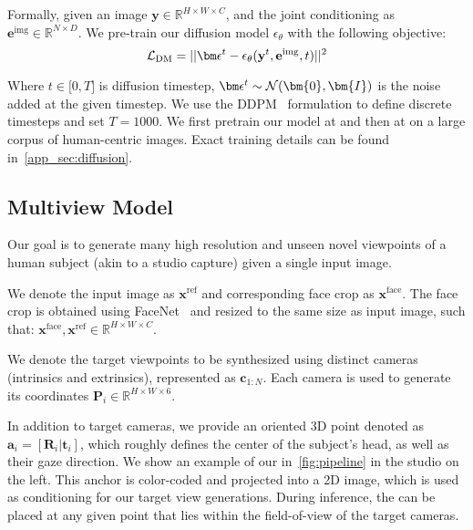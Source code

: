 Formally, given an image $\mathbf{y} \in \mathbb R^{H \times W \times C}$, and the joint conditioning as $\mathbf{e}^{\text{img}} \in \mathbb R^{N \times D}$. We pre-train our diffusion model $\epsilon_\theta$ with the following objective: 
\begin{equation}\label{eq:dm_loss}
    \mathcal{L}_{\mathrm{DM}} = ||\noise^t - \dmmodel(\mathbf{y}^{t}, \mathbf{e}^{\text{img}},  t)||^2
\end{equation}

\noindent Where $t \in \mathbb [0,T]$ is diffusion timestep, $\noise^t \sim \mathcal{N}(\bm{0}, \bm{I})$ is the noise added at the given timestep.  We use the DDPM~\citep{DDPM,FirstDiffusionModel} formulation to define discrete timesteps and set $T=1000$. We first pretrain our model at \restwo and then at \resthree on a large corpus of human-centric images. Exact training details can be found in~\cref{app_sec:diffusion}.

\subsection{Multiview Model} \label{ssec:multiview_model}

Our goal is to generate many high resolution and unseen novel viewpoints of a human subject (akin to a studio capture) given a single input image.

\vspace{1mm}
 We denote the input image as $\mathbf{x}^{\text{ref}}$ and corresponding face crop as $\mathbf{x}^{\text{face}}$. The face crop is obtained using FaceNet~\cite{schroff2015facenet} and resized to the same size as input image, such that: $\mathbf{x}^{\text{face}}, \mathbf{x}^{\text{ref}} \in \mathbb R^{H \times W \times C}$. 

\vspace{1mm}
 We denote the target viewpoints to be synthesized using distinct cameras (intrinsics and extrinsics), represented as $\mathbf{c}_{1:N}$. Each camera
is used to generate its \plucker coordinates $\mathbf{P}_i \in \mathbb R^{H \times W \times 6}$.


\vspace{1mm}
 In addition to target cameras, we provide an oriented 3D point denoted as $\mathbf{a}_i=[\mathbf{R}_{i}|\mathbf{t}_{i}]$, which roughly defines the center of the subject's head, as well as their gaze direction. We show an example of our \spatialanchor in~\cref{fig:pipeline} in the studio on the left. This anchor is color-coded and projected into a 2D image, which is used as conditioning for our target view generations.  During inference, the \spatialanchor can be placed at any given point that lies within the field-of-view of the target cameras.

